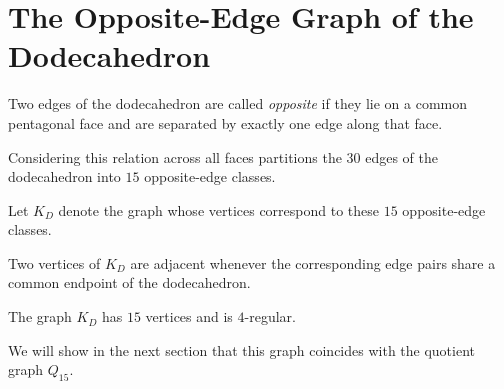 \section{The Opposite-Edge Graph of the Dodecahedron}

Two edges of the dodecahedron are called \emph{opposite} if they lie on
a common pentagonal face and are separated by exactly one edge along
that face.

Considering this relation across all faces partitions the $30$ edges
of the dodecahedron into $15$ opposite-edge classes.

\begin{definition}
Let $K_D$ denote the graph whose vertices correspond to these
$15$ opposite-edge classes.

Two vertices of $K_D$ are adjacent whenever the corresponding edge
pairs share a common endpoint of the dodecahedron.
\end{definition}

\begin{proposition}
The graph $K_D$ has $15$ vertices and is $4$-regular.
\end{proposition}

We will show in the next section that this graph coincides with the
quotient graph $Q_{15}$.
